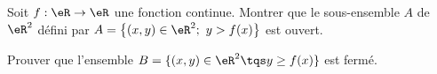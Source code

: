 \begin{exercice}[\minsyndical]\label{exoEspVectoNorme0008}

Soit $f : \eR \to \eR$ une fonction continue. Montrer que le sous-ensemble $A$ de $\eR ^2$ défini par $A = \left\{ (x,y) \in \eR ^2; \ y>f(x) \right\}$ est ouvert.

Prouver que l'ensemble $B=\{ (x,y)\in\eR^2\tqs y\geq f(x) \}$ est fermé.

\end{exercice}
